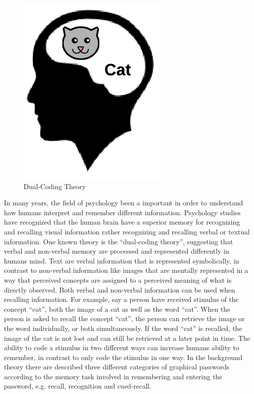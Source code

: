     \begin{figure}
      \vspace{-20pt}
      \begin{center}
        \includegraphics[scale=0.35]{pics/dualCoding.png}
      \end{center}
      \vspace{-20pt}
      \caption{Dual-Coding Theory}
      \vspace{-10pt}
    \end{figure}

    In many years, the field of psychology been a important in order to understand how humans interpret and remember different information. Psychology studies have recognized that the human brain have a superior memory for recognizing and recalling visual information rather recognizing and recalling verbal or textual information. One known theory is the ``dual-coding theory'', suggesting that verbal and non-verbal memory are processed and represented differently in humans mind. Text are verbal information that is represented symbolically, in contrast to non-verbal information like images that are mentally represented in a way that perceived concepts are assigned to a perceived meaning of what is directly observed. Both verbal and non-verbal information can be used when recalling information. For example, say a person have received stimulus of the concept ``cat'', both the image of a cat as well as the word ``cat''. When the person is asked to recall the concept ``cat'', the person can retrieve the image or the word individually, or both simultaneously. 
    If the word ``cat'' is recalled, the image of the cat is not lost and can still be retrieved at a later point in time. The ability to code a stimulus in two different ways can increase humans ability to remember, in contrast to only code the stimulus in one way.
    In the background theory there are described three different categories of graphical passwords according to the memory task involved in remembering and entering the password, e.g. recall, recognition and cued-recall. 

